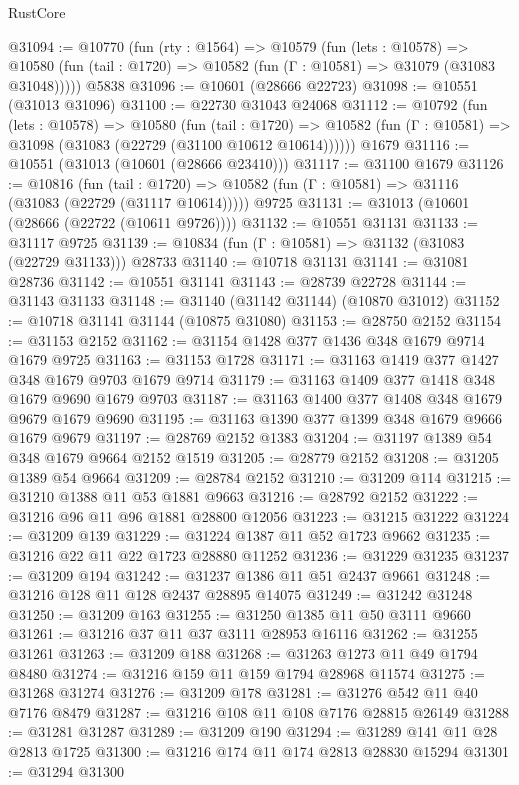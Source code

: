 \begin{lexlean}{RustCore}
\begin{coremodule}
@31094 := @10770
    (fun (rty : @1564) =>
    @10579
      (fun (lets : @10578) =>
      @10580 (fun (tail : @1720) => @10582 (fun (Γ : @10581) => @31079 (@31083 @31048)))))
    @5838
@31096 := @10601 (@28666 @22723)
@31098 := @10551 (@31013 @31096)
@31100 := @22730 @31043 @24068
@31112 := @10792
    (fun (lets : @10578) =>
    @10580
      (fun (tail : @1720) =>
      @10582 (fun (Γ : @10581) => @31098 (@31083 (@22729 (@31100 @10612 @10614))))))
    @1679
@31116 := @10551 (@31013 (@10601 (@28666 @23410)))
@31117 := @31100 @1679
@31126 := @10816
    (fun (tail : @1720) => @10582 (fun (Γ : @10581) => @31116 (@31083 (@22729 (@31117 @10614)))))
    @9725
@31131 := @31013 (@10601 (@28666 (@22722 (@10611 @9726))))
@31132 := @10551 @31131
@31133 := @31117 @9725
@31139 := @10834 (fun (Γ : @10581) => @31132 (@31083 (@22729 @31133))) @28733
@31140 := @10718 @31131
@31141 := @31081 @28736
@31142 := @10551 @31141
@31143 := @28739 @22728
@31144 := @31143 @31133
@31148 := @31140 (@31142 @31144) (@10870 @31012)
@31152 := @10718 @31141 @31144 (@10875 @31080)
@31153 := @28750 @2152
@31154 := @31153 @2152
@31162 := @31154 @1428 @377 @1436 @348 @1679 @9714 @1679 @9725
@31163 := @31153 @1728
@31171 := @31163 @1419 @377 @1427 @348 @1679 @9703 @1679 @9714
@31179 := @31163 @1409 @377 @1418 @348 @1679 @9690 @1679 @9703
@31187 := @31163 @1400 @377 @1408 @348 @1679 @9679 @1679 @9690
@31195 := @31163 @1390 @377 @1399 @348 @1679 @9666 @1679 @9679
@31197 := @28769 @2152 @1383
@31204 := @31197 @1389 @54 @348 @1679 @9664 @2152 @1519
@31205 := @28779 @2152
@31208 := @31205 @1389 @54 @9664
@31209 := @28784 @2152
@31210 := @31209 @114
@31215 := @31210 @1388 @11 @53 @1881 @9663
@31216 := @28792 @2152
@31222 := @31216 @96 @11 @96 @1881 @28800 @12056
@31223 := @31215 @31222
@31224 := @31209 @139
@31229 := @31224 @1387 @11 @52 @1723 @9662
@31235 := @31216 @22 @11 @22 @1723 @28880 @11252
@31236 := @31229 @31235
@31237 := @31209 @194
@31242 := @31237 @1386 @11 @51 @2437 @9661
@31248 := @31216 @128 @11 @128 @2437 @28895 @14075
@31249 := @31242 @31248
@31250 := @31209 @163
@31255 := @31250 @1385 @11 @50 @3111 @9660
@31261 := @31216 @37 @11 @37 @3111 @28953 @16116
@31262 := @31255 @31261
@31263 := @31209 @188
@31268 := @31263 @1273 @11 @49 @1794 @8480
@31274 := @31216 @159 @11 @159 @1794 @28968 @11574
@31275 := @31268 @31274
@31276 := @31209 @178
@31281 := @31276 @542 @11 @40 @7176 @8479
@31287 := @31216 @108 @11 @108 @7176 @28815 @26149
@31288 := @31281 @31287
@31289 := @31209 @190
@31294 := @31289 @141 @11 @28 @2813 @1725
@31300 := @31216 @174 @11 @174 @2813 @28830 @15294
@31301 := @31294 @31300

\end{coremodule}
\end{lexlean}
